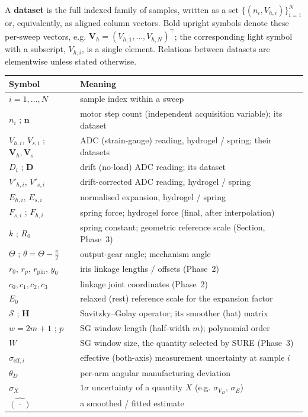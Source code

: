 \documentclass[11pt]{article}
\newcommand{\dset}[1]{\mathbf{#1}}          %
\newcommand{\Sg}{\mathcal{S}}               %
\newcommand{\unc}[1]{\sigma_{#1}}           %
\begin{document}
A \textbf{dataset} is the full indexed family of samples, written as a set
$\{(n_i, V_{h,i})\}_{i=1}^{N}$ or, equivalently, as aligned column vectors. Bold upright
symbols denote these per-sweep vectors, e.g. $\dset{V}_h=(V_{h,1},\dots,V_{h,N})^{\top}$;
the corresponding light symbol with a subscript, $V_{h,i}$, is a single element. Relations
between datasets are elementwise unless stated otherwise.

\begin{table}[h]
\centering
\small
\renewcommand{\arraystretch}{1.18}
\begin{tabular}{@{}ll@{}}
\toprule
\textbf{Symbol} & \textbf{Meaning}\\
\midrule
$i=1,\dots,N$ & sample index within a sweep\\
$n_i$ ; $\dset{n}$ & motor step count (independent acquisition variable); its dataset\\
$V_{h,i},\,V_{s,i}$ ; $\dset{V}_h,\dset{V}_s$ & ADC (strain-gauge) reading, hydrogel / spring; their datasets\\
$D_i$ ; $\dset{D}$ & drift (no-load) ADC reading; its dataset\\
$V'_{h,i},\,V'_{s,i}$ & drift-corrected ADC reading, hydrogel / spring\\
$E_{h,i},\,E_{s,i}$ & normalised expansion, hydrogel / spring\\
$F_{s,i}$ ; $F_{h,i}$ & spring force; hydrogel force (final, after interpolation)\\
$k$ ; $R_0$ & spring constant; geometric reference scale (Section, Phase~3)\\
$\Theta$ ; $\theta=\Theta-\tfrac{\pi}{2}$ & output-gear angle; mechanism angle\\
$r_0,\,r_p,\,r_{\mathrm{pin}},\,y_0$ & iris linkage lengths / offsets (Phase~2)\\
$c_0,c_1,c_2,c_3$ & linkage joint coordinates (Phase~2)\\
$E_0$ & relaxed (rest) reference scale for the expansion factor\\
$\Sg$ ; $\dset{H}$ & Savitzky--Golay operator; its smoother (hat) matrix\\
$w=2m+1$ ; $p$ & SG window length (half-width $m$); polynomial order\\
$W$ & SG window size, the quantity selected by SURE (Phase~3)\\
$\sigma_{\mathrm{eff},i}$ & effective (both-axis) measurement uncertainty at sample $i$\\
$\theta_D$ & per-arm angular manufacturing deviation\\
$\unc{X}$ & $1\sigma$ uncertainty of a quantity $X$ (e.g. $\unc{V_D}$, $\unc{E}$)\\
$\hat{(\,\cdot\,)}$ & a smoothed / fitted estimate\\
\bottomrule
\end{tabular}
\end{table}
\end{document}
